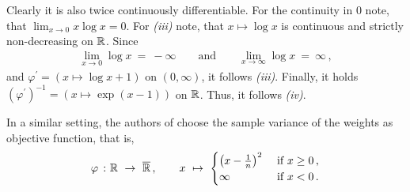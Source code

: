 \begin{example}
Clearly it is also twice continuously differentiable.
For the continuity in $0$ note, that $\lim_{x\to 0} x\log x=0$. 
For \textit{(iii)} note, that $x\mapsto \log x$ is continuous and strictly non-decreasing on $\mathbb{R}$. 
Since 
\begin{align*}
  \lim_{x\to 0}\log x\ =\ -\infty
  \qquad
  \text{and}
  \qquad
  \lim_{x\to \infty}\log x\ =\ \infty
  \,,
\end{align*}
and $\varphi^{'}=(x\mapsto \log x +1)$ on $(0,\infty)$, it follows \textit{(iii)}. 
Finally, it holds $(\varphi^{'})^{-1}=(x\mapsto \exp(x-1))$ on $\mathbb{R}$. 
Thus, it follows \textit{(iv)}.
\end{example}
\begin{example}
  In a similar setting, the authors of \cite{Zubizarreta2015} choose the sample variance of the weights as objective function, that is,
\begin{gather*}
  \varphi
  \ 
  \colon
  \R
  \ 
  \to
  \ 
  \overline{\R}
  \,,
  \qquad
  x
  \ 
  \mapsto
  \ 
  \begin{cases}
    \left(
      x-\frac
      {1}
      {n}
    \right)^2\ &\text{if}\ x\ge0\,, \\
    \infty\ &\text{if}\ x<0\,.
  \end{cases}
\end{gather*}
\end{example}
